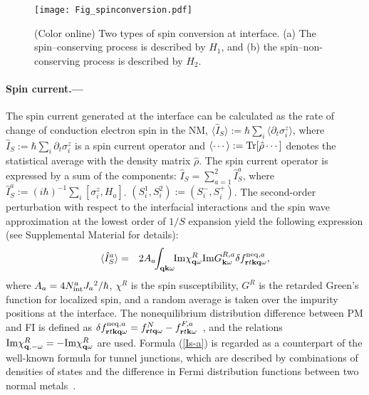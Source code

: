 \documentclass[aps,prl,reprint,showpacs]{revtex4-1}
\def\v#1{\mathbf{#1}}
\def\vq{\v{q}} 					%
\def\vk{\v{k}} 					%
\def\r{\v{r}} 					%
\def\q{\v{q}} 					%
\def\k{\v{k}} 					%
\def\del{\partial}
\def\la{\langle}
\def\ra{\rangle}
\def\IM{{\rm Im}} %
\def\ikqom{\int_{\vq\vk\omega}} %
\def\TR{{\rm Tr}}%
\begin{document}
\begin{figure}[!tb]
\begin{center}
\texttt{[image: Fig\_spinconversion.pdf]}
\caption{(Color online) Two types of spin conversion at interface. (a) The spin--conserving process is described by $H_1$, and (b) the spin--non-conserving process is described by $H_2$. }
\label{fig_spinconversion}
\end{center}
\end{figure}

\paragraph{Spin current.---}
The spin current generated at the interface can be calculated as the rate of change of conduction electron spin in the NM, $\la \hat{I}_S \ra := \hbar \sum_i \la \del_t \sigma^z_i \ra $, where $\hat{I}_S := \hbar \sum_i  \del_t \sigma^z_i $ is a spin current operator and $\la \cdots \ra := \TR [ \hat{\rho} \cdots ]$ denotes the statistical average with the density matrix $\hat{\rho}$.
The spin current operator is expressed by a sum of the components: $\hat{I}_S = \sum_{a=1}^2 \hat{I}_S^a$, where $\hat{I}_S^a := (i\hbar)^{-1}\sum_i [\sigma_i^z, H_a]$. $(S_i^1, S_i^2) := ( S_i^-, S_i^+)$. 
The second-order perturbation with respect to the interfacial interactions and the spin wave approximation at the lowest order of $1/S$ expansion yield the following expression (see Supplemental Material for details):
\begin{eqnarray}
\la \hat{I}^a_{S}\ra  &=&  2A_a \!\! \ikqom \!\! \IM \chi^{R}_{\q\omega} \IM G^{R,a}_{\k\omega} \delta f^{{\rm neq},a}_{\r t\k\q\omega}, \label{Is-a}
\end{eqnarray}
where $A_a = 4N_{\rm int}^a J_a{}^2/\hbar $, $\chi^{R}$ is the spin susceptibility, $G^{R}$ is the retarded Green's function for localized spin, 
and a random average is taken over the impurity positions at the interface. 
%
The nonequilibrium distribution difference between PM and FI is defined as $\delta f^{{\rm neq},a}_{\r t\k\q\omega} = f^{N}_{\r t\q\omega}-f^{F,a}_{\r t\k\omega}$~\cite{footnote1,Du17}, and the relations $\IM \chi^{R}_{\q,-\omega}= -\IM \chi^{R}_{\q\omega}$ are used. 
Formula (\ref{Is-a}) is regarded as a counterpart of the well-known formula for tunnel junctions, which are described by combinations of densities of states and the difference in Fermi distribution functions between two normal metals~\cite{Ingold92,Bruus04}.
\end{document}
